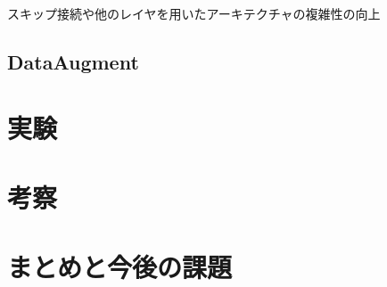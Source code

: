 \documentclass[twocolumn]{jarticle}     %
\begin{document}
スキップ接続や他のレイヤを用いたアーキテクチャの複雑性の向上

\subsection{DataAugment}


\section{実験}

\section{考察}

\section{まとめと今後の課題}




\end{document}
